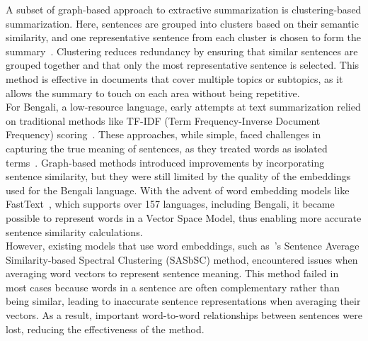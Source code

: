 A subset of graph-based approach to extractive summarization
is clustering-based summarization.
Here, sentences are grouped into clusters based on their
semantic similarity, and one representative sentence from each cluster is chosen
to form the summary~\cite{Mohan-2022-topic-modeling-rev-clustering}.
Clustering reduces redundancy by ensuring that similar
sentences are grouped together and that only the most
representative sentence is selected.
This method is effective in documents that cover multiple
topics or subtopics, as it allows the summary to touch on
each area without being repetitive.\\

For Bengali, a low-resource language, early attempts at text
summarization relied on traditional methods like TF-IDF
(Term Frequency-Inverse Document Frequency)
scoring~\cite{das-2022-tfidf,sarkar-2012-tfidf}.
These approaches, while simple, faced challenges in
capturing the true meaning of sentences, as they treated words as
isolated terms~\cite{tas-2017-rev-text-sum-2}.
Graph-based methods introduced improvements by
incorporating sentence similarity, but they were still limited by the
quality of the embeddings used for the Bengali language.
With the advent of word embedding models like
FastText~\cite{grave-etal-2018-fasttext}, which supports over 157
languages, including Bengali, it became possible to
represent words in a Vector Space Model, thus enabling
more accurate sentence similarity calculations.\\

However, existing models that use word embeddings,
such as~\citeauthor{roychowdhury-etal-2022-spectral-base}’s
\cite{roychowdhury-etal-2022-spectral-base} Sentence
Average Similarity-based Spectral Clustering (SASbSC) method,
encountered issues when averaging word vectors to represent sentence meaning.
This method failed in most cases because words in a sentence
are often complementary rather than being similar, leading
to inaccurate sentence representations when averaging their vectors.
As a result, important word-to-word relationships between
sentences were lost, reducing the effectiveness of the method.\\

